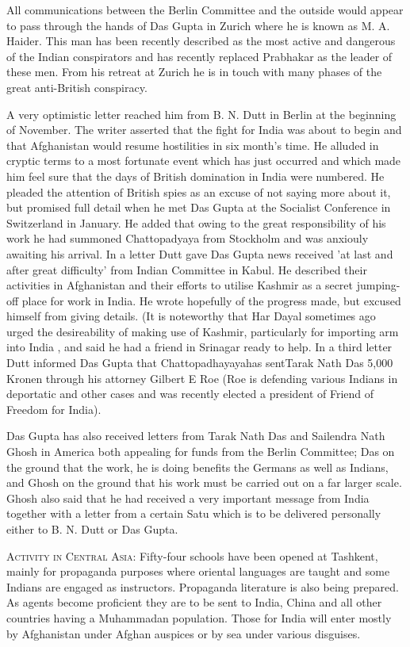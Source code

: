 All communications between the Berlin Committee and the outside would appear to pass through the hands of Das Gupta in Zurich where he is known as M. A. Haider. This man has been recently described as the most active and dangerous of the Indian conspirators and has recently replaced Prabhakar as the leader of these men. From his retreat at Zurich he is in touch with many phases of the great anti-British conspiracy. 

A very optimistic letter reached him from B. N. Dutt in Berlin at the beginning of November. The writer asserted that the fight for India was about to begin and that Afghanistan would resume hostilities in six month’s time. He alluded in cryptic terms to a most fortunate event which has just occurred and which made him feel sure that the days of British domination in India were numbered. He pleaded the attention of British spies as an excuse of not saying more about it, but promised full detail when he met Das Gupta at the Socialist Conference in Switzerland in January. He added that owing to the great responsibility of his work he had summoned Chattopadyaya from Stockholm and was anxiouly awaiting his arrival. In a letter Dutt gave Das Gupta news received 'at last and after great difficulty' from Indian Committee in 
Kabul. He described their activities in Afghanistan and their efforts to utilise Kashmir as a secret jumping-off place for work in India. He wrote hopefully of the progress made, but excused himself from giving details. (It is noteworthy that Har Dayal sometimes ago urged the desireability of making use of Kashmir, particularly for importing arm into India , and said he had a friend in Srinagar ready to help. In a third letter Dutt informed Das Gupta that Chattopadhayayahas sentTarak Nath Das 5,000 Kronen through his attorney Gilbert E Roe (Roe is defending various Indians in deportatic and other cases and was recently elected a president of Friend of Freedom for India). 

Das Gupta has also received letters from Tarak Nath Das and Sailendra Nath Ghosh in America both appealing for funds from the Berlin Committee; Das on the ground that the work, he is doing benefits the Germans as well as Indians, and Ghosh on the ground that his work must be carried out on a far larger scale. Ghosh also said that he had received a very important message from India together with a letter from a certain Satu which is to be delivered personally either to B. N. Dutt or Das Gupta. 

\textsc{Activity in Central Asia:} Fifty-four schools have been opened at Tashkent, mainly for propaganda purposes where oriental languages are taught and some Indians are engaged as instructors. Propaganda literature is also being prepared. As agents become proficient they are to be sent to India, China and all other countries having a Muhammadan population. Those for India will enter mostly by Afghanistan under Afghan auspices or by sea under various disguises. 

